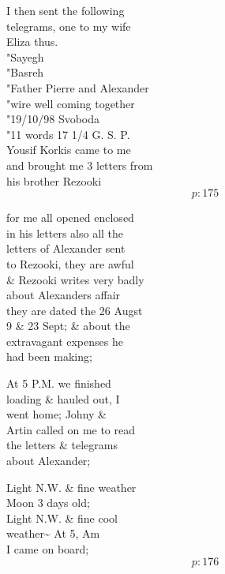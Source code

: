 \documentclass{report}
\begin{document}
	\par{
 	I then sent the following\ \\telegrams, one to my wife\ \\Eliza thus.\ \\"Sayegh\ \\"Basreh\ \\"Father Pierre and Alexander\ \\"wire well coming together\ \\"19/10/98 Svoboda\ \\"11 words 17 1/4 G. S. P.\ \\Yousif Korkis came to me\ \\and brought me 3 letters from\ \\his brother Rezooki\ \\
  \[p: 175 \]

	}





	\par{
 	for me all opened enclosed\ \\in his letters also all the\ \\letters of Alexander sent\ \\to Rezooki, they are awful\ \\\& Rezooki writes very badly\ \\about Alexanders affair\ \\they are dated the 26 Augst\ \\9 \& 23 Sept; \& about the\ \\extravagant expenses he\ \\had been making;\ \\
	}

	\par{
 	At 5 P.M. we finished\ \\loading \& hauled out, I\ \\went home; Johny \&\ \\Artin called on me to read\ \\the letters \& telegrams\ \\about Alexander;\ \\
	}

	\par{
 	Light N.W. \& fine weather\ \\Moon 3 days old;\ \\Light N.W. \& fine cool\ \\weather\~{} At 5, Am\ \\I came on board;\ \\
  \[p: 176 \]

	}
\end{document}
